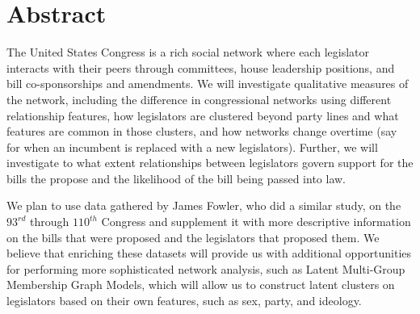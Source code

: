 \section{Abstract}

The United States Congress is a rich social network where each legislator 
interacts with their peers through committees, house leadership positions, and 
bill co-sponsorships and amendments. We will investigate qualitative measures 
of the network, including the difference in congressional networks using 
different relationship features, how legislators are clustered beyond party 
lines and what features are common in those clusters, and how networks change 
overtime (say for when an incumbent is replaced with a new legislators). 
Further, we will investigate to what extent relationships between legislators 
govern support for the bills the propose and the likelihood of the bill being 
passed into law.

We plan to use data gathered by James Fowler, who did a similar study, on the 
$93^{rd}$ through $110^{th}$ Congress and supplement it with more descriptive 
information on the bills that were proposed and the legislators that proposed 
them. We believe that enriching these datasets will provide us with additional 
opportunities for performing more sophisticated network analysis, such as 
Latent Multi-Group Membership Graph Models, which will allow us to construct 
latent clusters on legislators based on their own features, such as sex, 
party, and ideology.
